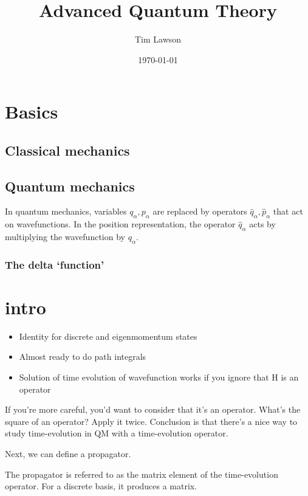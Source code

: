 \documentclass[a4paper]{extarticle}
\title{Advanced Quantum Theory}
\author{Tim Lawson}
\date{\today}
\begin{document}
\maketitle

\tableofcontents
\listoftheorems

\section{Basics}

\subsection{Classical mechanics}

\subsection{Quantum mechanics}

In quantum mechanics, variables $q_\alpha, p_\alpha$ are replaced by operators
$\hat{q}_\alpha, \hat{p}_\alpha$ that act on wavefunctions.
In the position representation, the operator $\hat{q}_\alpha$ acts by
multiplying the wavefunction by $q_\alpha$.

\subsubsection{The delta `function'}

\section{intro}

\begin{itemize}
  \item Identity for discrete and eigenmomentum states
  \item Almost ready to do path integrals
  \item Solution of time evolution of wavefunction works if you ignore that H is an operator
\end{itemize}

If you're more careful, you'd want to consider that it's an operator.
What's the square of an operator? Apply it twice.
Conclusion is that there's a nice way to study time-evolution in QM with a time-evolution operator.

Next, we can define a propagator.

The propagator is referred to as the matrix element of the time-evolution operator.
For a discrete basis, it produces a matrix.
\end{document}
